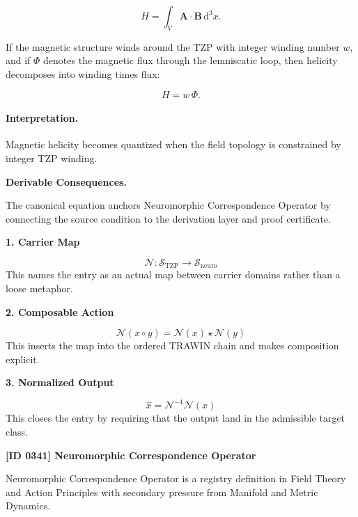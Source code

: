 \begin{equation}
H
=
\int_V
\mathbf{A}\cdot\mathbf{B}
\,\mathrm{d}^3x .
\end{equation}

If the magnetic structure winds around the TZP with integer winding number $w$, and if $\Phi$ denotes the magnetic flux through the lemniscatic loop, then helicity decomposes into winding times flux:

\begin{equation}
\boxed{
H=w\,\Phi .
}
\end{equation}

\paragraph{Interpretation.}
Magnetic helicity becomes quantized when the field topology is constrained by integer TZP winding.

\par\vspace{0.35em}
\noindent\textbf{Derivable Consequences.}\quad
\begingroup
\footnotesize
\raggedright
The canonical equation anchors Neuromorphic Correspondence Operator by connecting the source condition to the derivation layer and proof certificate.
\par\endgroup

\noindent\textbf{1. Carrier Map}\par
\[
\mathcal{N}:\mathcal{S}_{\mathrm{TZP}}\to\mathcal{S}_{\mathrm{neuro}}
\]
\noindent This names the entry as an actual map between carrier domains rather than a loose metaphor.\par
\noindent\textbf{2. Composable Action}\par
\[
\mathcal{N}(x\circ y)=\mathcal{N}(x)\star\mathcal{N}(y)
\]
\noindent This inserts the map into the ordered TRAWIN chain and makes composition explicit.\par
\noindent\textbf{3. Normalized Output}\par
\[
\widehat{x}=\mathcal{N}^{-1}\mathcal{N}(x)
\]
\noindent This closes the entry by requiring that the output land in the admissible target class.\par

\clearpage
\noindent\textbf{[ID 0341] Neuromorphic Correspondence Operator}\par
\vspace{0.35em}
\begingroup\small
{}
Neuromorphic Correspondence Operator is a registry definition in Field Theory and Action Principles with secondary pressure from Manifold and Metric Dynamics.


